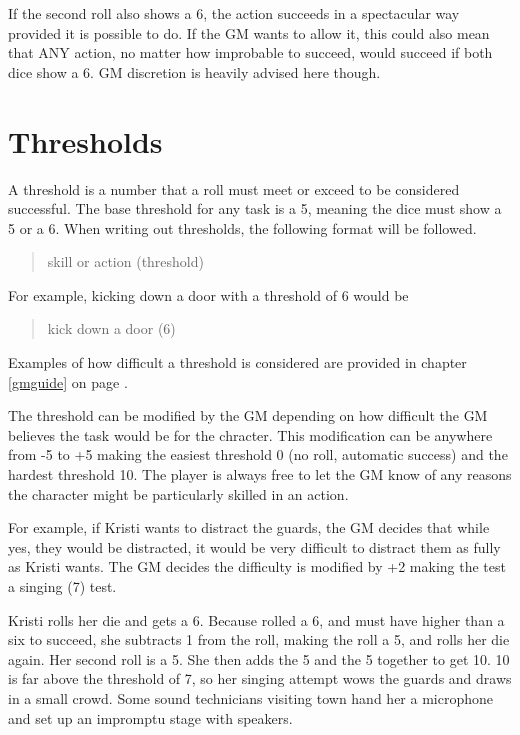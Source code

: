 \begin{flushleft}
If the second roll also shows a 6, the action succeeds in a spectacular way
provided it is possible to do. If the GM wants to allow it, this could also
mean that ANY action, no matter how improbable to succeed, would succeed if
both dice show a 6. GM discretion is heavily advised here though.

\section*{Thresholds} \label{dice_thresholds}

A threshold is a number that a roll must meet or exceed to be considered
successful. The base threshold for any task is a 5, meaning  the dice must show
a 5 or a 6. When writing out thresholds, the following format will be followed.

\begin{quotation}
\centering
    skill or action (threshold)
\end{quotation}

For example, kicking down a door with a threshold of 6 would be

\begin{quotation}
\centering
    kick down a door (6)
\end{quotation}

Examples of how difficult a threshold is considered are provided in chapter
\ref{gmguide} on page \pageref{threshold_difficulties}.

The threshold can be modified by the GM depending on how difficult the GM
believes the task would be for the chracter. This modification can be anywhere
from -5 to +5 making the easiest threshold 0 (no roll, automatic success) and
the hardest threshold 10. The player is always free to let the GM know of any
reasons the character might be particularly skilled in an action.

For example, if Kristi wants to distract the guards, the GM decides that
while yes, they would be distracted, it would be very difficult to distract
them as fully as Kristi wants. The GM decides the difficulty is modified by
+2 making the test a singing (7) test.

Kristi rolls her die and gets a 6. Because rolled a 6, and must have higher
than a six to succeed, she subtracts 1 from the roll, making the roll a 5, and
rolls her die again. Her second roll is a 5. She then adds the 5 and the 5
together to get 10. 10 is far above the threshold of 7, so her singing attempt
wows the guards and draws in a small crowd. Some sound technicians visiting
town hand her a microphone and set up an impromptu stage with speakers.


\end{flushleft}
